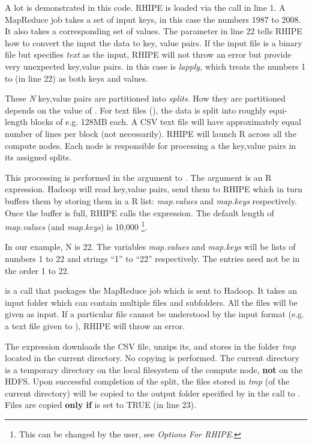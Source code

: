 \documentclass[letterpaper,10pt,english]{sphinxmanual}
\begin{document}
A lot is demonstrated in this code. RHIPE is loaded via the call in line 1. A
MapReduce job takes a set of input keys, in this case the numbers 1987
to 2008. It also takes a corresponding set of values. The parameter  in
line 22 tells RHIPE how to convert the input the data to key, value pairs. If
the input file is a binary file but  specifies \emph{text} as the input,
RHIPE will not throw an error but provide very unexpected key,value
pairs.  in this case is \emph{lapply}, which treats the numbers 1 to 
(in line 22) as both keys and values.

These \emph{N} key,value pairs are partitioned into \emph{splits}. How they are
partitioned depends on the value of . For text files
(), the data is split into roughly equi-length blocks of
e.g. 128MB each. A CSV text file will have approximately equal number of lines
per block (not necessarily). RHIPE will launch R across all the compute
nodes. Each node is responsible for processing a the key,value pairs in its
assigned splits.

This processing is performed in the  argument to . The 
argument is an R expression. Hadoop will read key,value pairs, send them to
RHIPE which in turn buffers them by storing them in a R list: \emph{map.values} and
\emph{map.keys} respectively. Once the buffer is full, RHIPE calls the 
expression. The default length of \emph{map.values} (and \emph{map.keys}) is 10,000 \footnote{
This can be changed by the user, see \emph{Options For RHIPE}.
}.

In our example, N is 22. The variables \emph{map.values} and \emph{map.keys} will be lists
of numbers 1 to 22 and strings ``1'' to ``22'' respectively. The entries need not be
in the order 1 to 22.

 is a call that packages the MapReduce job which is sent to Hadoop. It
takes an input folder which can contain multiple files and subfolders. All the
files will be given as input. If a particular file cannot be understood by the
input format (e.g. a text file given to ), RHIPE will throw an error.

The expression downloads the CSV file, unzips its, and stores in the folder
\emph{tmp} located in the current directory. No copying is performed. The current
directory is a temporary directory on the local filesystem of the compute node,
\textbf{not} on the HDFS. Upon successful completion of the split, the files
stored in \emph{tmp} (of the current directory) will be copied to the output folder
specified by  in the call to . Files are copied \textbf{only if}
 is set to TRUE (in line 23).
\end{document}
